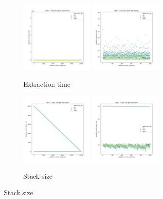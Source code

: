 \begin{figure}
    \begin{subfigure}[b]{\textwidth}
        \centering
        \includegraphics[width=0.40\textwidth]{./fragments/05_workhorse_experiment/images/01_basebenchmark_03_sort_d_case.png.1_0.png}
        \includegraphics[width=0.40\textwidth]{./fragments/05_workhorse_experiment/images/01_basebenchmark_03_sort_d_case.png.1_1.png}
        \caption{Extraction time}
        \label{FIG:WORKHORSE_BENCHMARK_03__0_0}
    \end{subfigure}

    \begin{subfigure}[b]{\textwidth}
        \centering
        \includegraphics[width=0.40\textwidth]{./fragments/05_workhorse_experiment/images/01_basebenchmark_03_sort_d_case.png.2_0.png}
        \includegraphics[width=0.40\textwidth]{./fragments/05_workhorse_experiment/images/01_basebenchmark_03_sort_d_case.png.2_1.png}
        \caption{Stack size}
        \label{FIG:WORKHORSE_BENCHMARK_03__0_0}
    \end{subfigure}
    

\end{figure}
